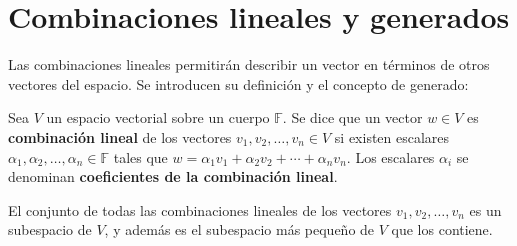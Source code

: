 \section{Combinaciones lineales y generados}
Las combinaciones lineales permitirán describir un vector en términos de otros vectores del espacio. Se introducen su definición y el concepto de generado:

\begin{definition}\label{def:comblineal}
Sea $V$ un espacio vectorial sobre un cuerpo $\mathbb{F}$. Se dice que un vector $w \in V$ es \textbf{combinación lineal} de los vectores $v_1,v_2,\dots, v_n \in V$ si existen escalares $\alpha_1,\alpha_2,\dots,\alpha_n \in \mathbb{F}$ tales que  \(w = \alpha_1 v_1 + \alpha_2 v_2 + \cdots + \alpha_n v_n.\)
Los escalares $\alpha_i$ se denominan \textbf{coeficientes de la combinación lineal}.
\end{definition}

\begin{theorem} 
El conjunto de todas las combinaciones lineales de los vectores $v_1,v_2,\dots, v_n$ es un subespacio de $V$, y además es el subespacio más pequeño de $V$ que los contiene.
\end{theorem}

